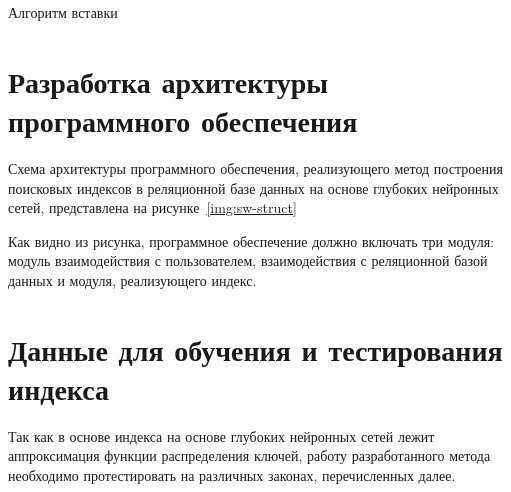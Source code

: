 \begin{algorithm}[H]
    \caption{Алгоритм вставки ~~~~~~~~~~~~~~~~~~~~~~~~~~~~~~~~~~~~~~~~~~~~~~~~}
    \label{alg:insert}
    \small


\end{algorithm}
\vspace{0.5cm}

\section{Разработка архитектуры программного обеспечения}

Схема архитектуры программного обеспечения, реализующего метод построения
поисковых индексов в реляционной базе данных на основе глубоких нейронных сетей,
представлена на рисунке~\ref{img:sw-struct}


Как видно из рисунка, программное обеспечение должно включать три модуля:
модуль взаимодействия с пользователем, взаимодействия с реляционной базой данных и
модуля, реализующего индекс.


\section{Данные для обучения и тестирования индекса\label{data}}

Так как в основе индекса на основе глубоких нейронных сетей лежит аппроксимация
функции распределения ключей, работу разработанного метода необходимо
протестировать на различных законах, перечисленных далее.

